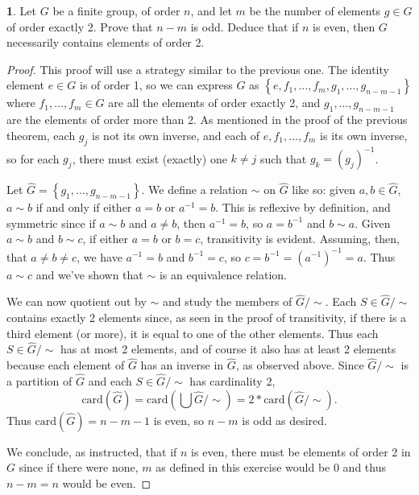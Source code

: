\documentclass{article}
\theoremstyle{definition}
\newtheorem{ex}{}[section]
\begin{document}
\begin{ex}
	Let $G$ be a finite group, of order $n$, and let $m$ be the number of elements $g \in G$ of order exactly 2.
	Prove that $n - m$ is odd.
	Deduce that if $n$ is even, then $G$ necessarily contains elements of order 2.
\end{ex}
\begin{proof}
	This proof will use a strategy similar to the previous one.
	The identity element $e \in G$ is of order 1, so we can express $G$ as $\left\lbrace e, f_1, \dots, f_m, g_1, \dots, g_{n - m - 1} \right\rbrace$ where $f_1, \dots, f_m \in G$ are all the elements of order exactly 2, and $g_1, \dots, g_{n - m - 1}$ are the elements of order more than 2.
	As mentioned in the proof of the previous theorem, each $g_j$ is not its own inverse, and each of $e, f_1, \dots, f_m$ is its own inverse, so for each $g_j$, there must exist (exactly) one $k \neq j$ such that $g_k = (g_j)^{-1}$.

	Let $\hat{G} = \left\lbrace g_1, \dots, g_{n - m - 1} \right\rbrace$.
	We define a relation $\sim$ on $\hat{G}$ like so: given $a, b \in \hat{G}$, $a \sim b$ if and only if either $a = b$ or $a^{-1} = b$.
	This is reflexive by definition, and symmetric since if $a \sim b$ and $a \neq b$, then $a^{-1} = b$, so $a = b^{-1}$ and $b \sim a$.
	Given $a \sim b$ and $b \sim c$, if either $a = b$ or $b = c$, transitivity is evident.
	Assuming, then, that $a \neq b \neq c$, we have $a^{-1} = b$ and $b^{-1} = c$, so $c = b^{-1} = (a^{-1})^{-1} = a$.
	Thus $a \sim c$ and we've shown that $\sim$ is an equivalence relation.

	We can now quotient out by $\sim$ and study the members of $\hat{G}/{\sim}$.
	Each $S \in \hat{G}/{\sim}$ contains exactly 2 elements since, as seen in the proof of transitivity, if there is a third element (or more), it is equal to one of the other elements.
	Thus each $S \in \hat{G}/{\sim}$ has at most 2 elements, and of course it also has at least 2 elements because each element of $\hat{G}$ has an inverse in $\hat{G}$, as observed above.
	Since $\hat{G}/{\sim}$ is a partition of $\hat{G}$ and each $S \in \hat{G}/{\sim}$ has cardinality 2, \begin{equation*}
		\mathrm{card}\left(\hat{G}\right) = \mathrm{card}\left(\bigcup \hat{G}/{\sim}\right) = 2 * \mathrm{card}(\hat{G}/{\sim}).
	\end{equation*}
	Thus $\mathrm{card}(\hat{G}) = n - m - 1$ is even, so $n - m$ is odd as desired.

	We conclude, as instructed, that if $n$ is even, there must be elements of order 2 in $G$ since if there were none, $m$ as defined in this exercise would be 0 and thus $n - m = n$ would be even.
\end{proof}
\end{document}
